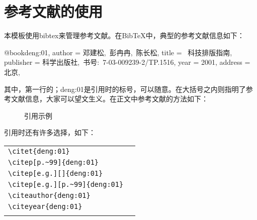 \chapter{参考文献的使用}
\label{c:bib}

本模板使用bibtex来管理参考文献。在BibTeX中，典型的参考文献信息如下：
\begin{code}
    @book{deng:01,
        author =       {{邓建松,~彭冉冉,~陈长松}},
        title =        {\LaTeXe{}~科技排版指南},
        publisher =    {科学出版社,~书号:~7-03-009239-2/TP.1516},
        year =         {2001},
        address =      {北京},
    }
\end{code}

其中，第一行的；deng:01是引用时的标号，可以随意。在大括号之内则指明了参考文献信息，大家可以望文生义。在正文中参考文献的方法如下：
\begin{figure}[h]
\centering
{}
\hspace{0.1\textwidth}
\begin{minipage}[t]{0.4\textwidth}
\centering
\begin{code}
引用示例\cite{deng:01}
\end{code}
\end{minipage}
\end{figure}

引用时还有许多选择，如下：\\
\begin{center}
\begin{tabular}{ll}
\whline
\verb|\citet{deng:01}|  &   \citet{deng:01}\\
\verb|\citep[p.~99]{deng:01}|&  \citep[p.~99]{deng:01}\\
\verb|\citep[e.g.][]{deng:01}|& \citep[e.g.][]{deng:01}\\
\verb|\citep[e.g.][p.~99]{deng:01}| &\citep[e.g.][p.~99]{deng:01}\\
\verb|\citeauthor{deng:01}|& \citeauthor{deng:01}\\
\verb|\citeyear{deng:01}|&\citeyear{deng:01}\\
\whline
\end{tabular}
\end{center} 